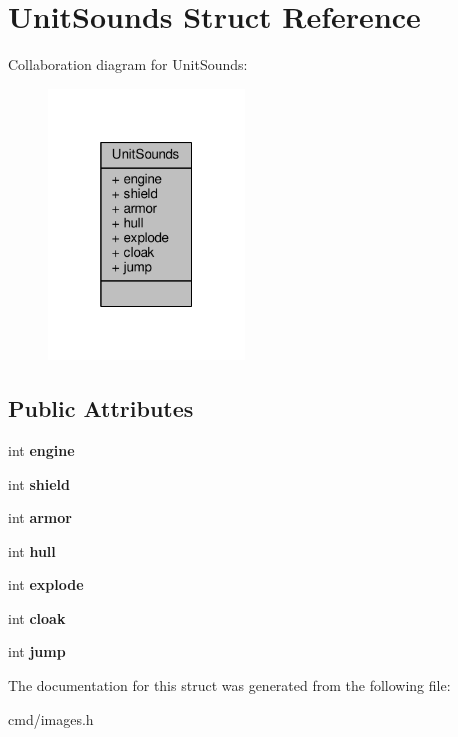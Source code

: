 \hypertarget{structUnitSounds}{}\section{Unit\+Sounds Struct Reference}
\label{structUnitSounds}


Collaboration diagram for Unit\+Sounds\+:
\nopagebreak
\begin{figure}[H]
\begin{center}
\leavevmode
\includegraphics[width=148pt]{d6/dbb/structUnitSounds__coll__graph}
\end{center}
\end{figure}
\subsection*{Public Attributes}
\begin{DoxyCompactItemize}
\item 
int {\bfseries engine}\hypertarget{structUnitSounds_ad3cb8ed0635b2b693afa93120687cfe3}{}\label{structUnitSounds_ad3cb8ed0635b2b693afa93120687cfe3}

\item 
int {\bfseries shield}\hypertarget{structUnitSounds_a995d98ca55581fd10a47ff8c5df58494}{}\label{structUnitSounds_a995d98ca55581fd10a47ff8c5df58494}

\item 
int {\bfseries armor}\hypertarget{structUnitSounds_a66a56f673b23a154e9fbdfa3a9ccdb71}{}\label{structUnitSounds_a66a56f673b23a154e9fbdfa3a9ccdb71}

\item 
int {\bfseries hull}\hypertarget{structUnitSounds_a3b6142a7f5e2d7bc18625294fda77a69}{}\label{structUnitSounds_a3b6142a7f5e2d7bc18625294fda77a69}

\item 
int {\bfseries explode}\hypertarget{structUnitSounds_a319ebe504b813c324411ab08d14c165e}{}\label{structUnitSounds_a319ebe504b813c324411ab08d14c165e}

\item 
int {\bfseries cloak}\hypertarget{structUnitSounds_a824c4a7375b82153d40f1f808deeaf09}{}\label{structUnitSounds_a824c4a7375b82153d40f1f808deeaf09}

\item 
int {\bfseries jump}\hypertarget{structUnitSounds_ae0c38870fe86fb71f5a0dc8f40a82b9b}{}\label{structUnitSounds_ae0c38870fe86fb71f5a0dc8f40a82b9b}

\end{DoxyCompactItemize}


The documentation for this struct was generated from the following file\+:\begin{DoxyCompactItemize}
\item 
cmd/images.\+h\end{DoxyCompactItemize}
